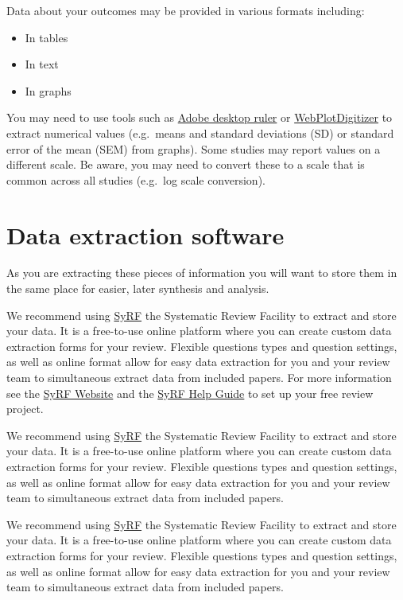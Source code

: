 \documentclass[
]{book}
\providecommand{\tightlist}{%
  \setlength{\itemsep}{0pt}\setlength{\parskip}{0pt}}
\begin{document}
Data about your outcomes may be provided in various formats including:

\begin{itemize}
\tightlist
\item
  In tables
\item
  In text
\item
  In graphs
\end{itemize}

You may need to use tools such as \href{https://helpx.adobe.com/acrobat/using/grids-guides-measurements-pdfs.html}{Adobe desktop ruler} or \href{https://automeris.io/WebPlotDigitizer/}{WebPlotDigitizer} to extract numerical values (e.g.~means and standard deviations (SD) or standard error of the mean (SEM) from graphs). Some studies may report values on a different scale. Be aware, you may need to convert these to a scale that is common across all studies (e.g.~log scale conversion).

\hypertarget{data-extraction-software}{%
\section{Data extraction software}\label{data-extraction-software}}

As you are extracting these pieces of information you will want to store them in the same place for easier, later synthesis and analysis.

We recommend using \href{https://syrf.org.uk/}{SyRF} the Systematic Review Facility to extract and store your data. It is a free-to-use online platform where you can create custom data extraction forms for your review. Flexible questions types and question settings, as well as online format allow for easy data extraction for you and your review team to simultaneous extract data from included papers. For more information see the \href{https://syrf.org.uk/}{SyRF Website} and the \href{https://help.syrf.org.uk/}{SyRF Help Guide} to set up your free review project.

We recommend using \href{http://syrf.org.uk/}{SyRF} the Systematic Review Facility to extract and store your data. It is a free-to-use online platform where you can create custom data extraction forms for your review. Flexible questions types and question settings, as well as online format allow for easy data extraction for you and your review team to simultaneous extract data from included papers.

We recommend using \href{http://syrf.org.uk/}{SyRF} the Systematic Review Facility to extract and store your data. It is a free-to-use online platform where you can create custom data extraction forms for your review. Flexible questions types and question settings, as well as online format allow for easy data extraction for you and your review team to simultaneous extract data from included papers.
\end{document}
